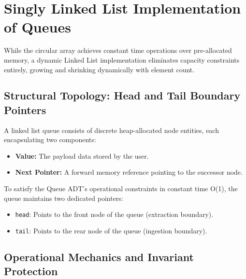 \documentclass[10pt,journal,compsoc,onecolumn]{IEEEtran}
\begin{document}
\section{Singly Linked List Implementation of Queues}
\label{sec:linked_list_queue}

While the circular array achieves constant time operations over pre-allocated memory, a dynamic Linked List implementation eliminates capacity constraints entirely, growing and shrinking dynamically with element count.

\subsection{Structural Topology: Head and Tail Boundary Pointers}

A linked list queue consists of discrete heap-allocated node entities, each encapsulating two components:
\begin{itemize}
    \item \textbf{Value:} The payload data stored by the user.
    \item \textbf{Next Pointer:} A forward memory reference pointing to the successor node.
\end{itemize}

To satisfy the Queue ADT's operational constraints in constant time O(1), the queue maintains two dedicated pointers:
\begin{itemize}
    \item \texttt{head}: Points to the front node of the queue (extraction boundary).
    \item \texttt{tail}: Points to the rear node of the queue (ingestion boundary).
\end{itemize}

\subsection{Operational Mechanics and Invariant Protection}
\end{document}

